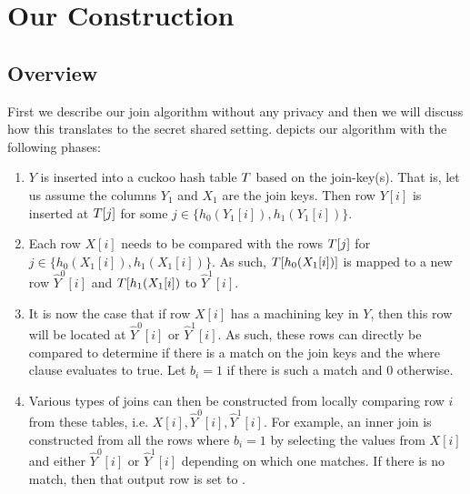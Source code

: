 \section{Our Construction}\label{sec:construction}



\subsection{Overview}
First we describe our join algorithm without any privacy and then we will discuss how this translates to the secret shared setting.  depicts our algorithm with the following phases:
\begin{enumerate}
	\item \label{step:overview1}  $Y$ is inserted into a cuckoo hash table $T$ based on the join-key(s). That is, let us assume the columns $Y_1$ and $X_1$ are the join keys. Then 
	row $Y[i]$ is inserted at $T[j]$ for some $j\in \{h_0(Y_1[i]), h_1(Y_1[i])\}$.
	\item \label{step:overview2} Each row $X[i]$ needs to be compared with the rows $T[j]$ for $j\in \{h_0(X_1[i]), h_1(X_1[i])\}$. As such, $T[h_0(X_1[i])]$ is mapped to a new row $\widehat{Y}^0[i]$ and $T[h_1(X_1[i])$ to $\widehat{Y}^1[i]$. 
	\item \label{step:overview3} It is now the case that if row $X[i]$ has a machining key in $Y$, then this row will be located at $\widehat{Y}^0[i]$ or $\widehat{Y}^1[i]$. As such, these rows can directly be compared to determine if there is a match on the join keys and the where clause evaluates to true. Let $b_i=1$ if there is such a match and $0$ otherwise.
	\item \label{step:overview4} Various types of joins can then be constructed from locally comparing row $i$ from these tables, i.e. $X[i],\widehat{Y}^0[i], \widehat{Y}^1[i]$. For example, an inner join is constructed from all the rows where $b_i=1$ by selecting the values from $X[i]$ and either $\widehat{Y}^0[i]$ or $\widehat{Y}^1[i]$ depending on which one matches. If there is no match, then that output row is set to \Null.
\end{enumerate} 

